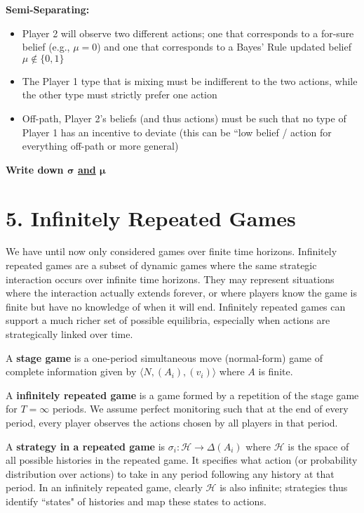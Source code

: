\documentclass{report}
\renewcommand{\chaptermark}[1]{\markboth{#1}{}}
\newcommand{\FlowerSmall}{\mbox{\raisebox{-1pt}{\small\EightFlowerPetalRemoved}}} %
\begin{document}
\begin{mdframed}
\begin{itemize}[label=\FlowerSmall]
	\end{itemize}
	\textbf{Semi-Separating:}
	\begin{itemize}[label=\FlowerSmall]
		\item Player 2 will observe two different actions; one that corresponds to a for-sure belief (e.g., $\mu = 0$) and one that corresponds to a Bayes' Rule updated belief $\mu \notin \{0,1\}$
		\item The Player 1 type that is mixing must be indifferent to the two actions, while the other type must strictly prefer one action
		\item Off-path, Player 2's beliefs (and thus actions) must be such that no type of Player 1 has an incentive to deviate (this can be ``low belief / action for everything off-path or more general)
	\end{itemize}
	\textbf{Write down $\boldsymbol{\sigma}$ \underline{and} $\boldsymbol{\mu}$}
	\smallskip
\end{mdframed}
\bigskip



\chapter*{5. Infinitely Repeated Games}
\thispagestyle{fancy}
\chaptermark{5. Infinitely Repeated Games} \bigskip

We have until now only considered games over finite time horizons. Infinitely repeated games are a subset of dynamic games where the same strategic interaction occurs over infinite time horizons. They may represent situations where the interaction actually extends forever, or where players know the game is finite but have no knowledge of when it will end. Infinitely repeated games can support a much richer set of possible equilibria, especially when actions are strategically linked over time. \bigskip

A \textbf{stage game} is a one-period simultaneous move (normal-form) game of complete information given by $\langle N, (A_i),(v_i) \rangle$ where $A$ is finite. \bigskip

A \textbf{infinitely repeated game} is a game formed by a repetition of the stage game for $T=\infty$ periods. We assume perfect monitoring such that at the end of every period, every player observes the actions chosen by all players in that period. \bigskip

A \textbf{strategy in a repeated game} is $\sigma_i: \mathcal{H} \rightarrow \Delta (A_i)$ where $\mathcal{H}$ is the space of all possible histories in the repeated game. It specifies what action (or probability distribution over actions) to take in any period following any history at that period. In an infinitely repeated game, clearly $\mathcal{H}$ is also infinite; strategies thus identify ``states" of histories and map these states to actions. \bigskip
\end{document}
